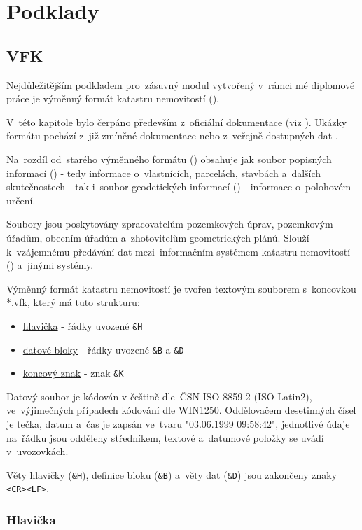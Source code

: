 \chapter{Podklady}
\label{podklady}

\section{VFK}
\label{vfk}

Nejdůležitějším podkladem pro~zásuvný modul vytvořený v~rámci mé diplomové práce je výměnný formát katastru nemovitostí ().

V~této kapitole bylo čerpáno především z~oficiální dokumentace (viz \citep{struktura_vfk}). Ukázky formátu pochází z~již zmíněné dokumentace nebo z~veřejně dostupných dat \citep{zdroj_vfk}.

Na~rozdíl od~starého výměnného formátu () obsahuje  jak soubor popisných informací () - tedy informace o~vlastnících, parcelách, stavbách a~dalších skutečnostech - tak i~soubor geodetických informací () - informace o~polohovém určení.

Soubory  jsou poskytovány zpracovatelům pozemkových úprav, pozemkovým úřadům, obecním úřadům a~zhotovitelům geometrických plánů. Slouží k~vzájemnému předávání dat mezi~informačním systémem katastru nemovitostí () a~jinými systémy.

Výměnný formát katastru nemovitostí je tvořen textovým souborem s~koncovkou *.vfk, který má tuto strukturu:
	\begin{itemize}[leftmargin=1.5cm, noitemsep]
		\item \underline{hlavička} - řádky uvozené \texttt{\&H}
		\item \underline{datové bloky} - řádky uvozené \texttt{\&B} a \texttt{\&D}
		\item \underline{koncový znak} - znak \texttt{\&K}
	\end{itemize}

Datový soubor je kódován v češtině dle~ČSN ISO 8859-2 (ISO Latin2), ve~výjimečných případech kódování dle
WIN1250. Oddělovačem desetinných čísel je tečka, datum a~čas je zapsán ve~tvaru "03.06.1999 09:58:42", jednotlivé údaje na~řádku jsou odděleny středníkem, textové a~datumové položky se uvádí v~uvozovkách.

Věty hlavičky (\texttt{\&H}), definice bloku (\texttt{\&B}) a~věty dat (\texttt{\&D}) jsou zakončeny znaky \texttt{<CR><LF>}.

\subsection{Hlavička}
\label{hlavicka}


